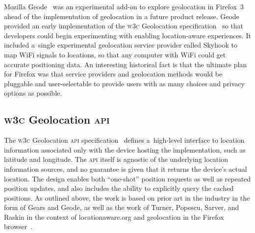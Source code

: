 \documentclass[sigconf,hyphens]{acmart}
\begin{document}
Mozilla Geode~\cite{beard2008geode} was an experimental add-on to explore geolocation in Firefox~3
ahead of the implementation of geolocation in a future product release.
Geode provided an early implementation of the \textsc{w3c} Geolocation
specification~\cite{popescu2016geolocation} so that developers could begin experimenting
with enabling location-aware experiences.
It included a~single experimental geolocation service provider called Skyhook to map WiFi signals
to locations, so that any computer with WiFi could get accurate positioning data.
An interesting historical fact is that the ultimate plan for Firefox was that service providers
and geolocation methods would be pluggable and user-selectable to provide users
with as many choices and privacy options as possible.

\subsection{\textsc{w3c} Geolocation \textsc{api}}

The \textsc{w3c} Geolocation \textsc{api} specification~\cite{popescu2016geolocation}
defines a~high-level interface to location information
associated only with the device hosting the implementation, such as latitude and longitude.
The \textsc{api} itself is agnostic of the underlying location information sources,
and no guarantee is given that it returns the device's actual location.
The design enables both ``one-shot'' position requests as well as repeated position updates,
and also includes the ability to explicitly query the cached positions.
As outlined above, the work is based on prior art in the industry in the form of Gears and Geode,
as well as the work of Turner, Popescu, Sarver, and Raskin in the context of locationaware.org and
geolocation in the Firefox browser~\cite{raskin2010geolocation}.
\end{document}
